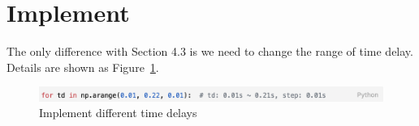 \section{Implement} %
The only difference with Section 4.3 is we need to change the range of time delay. Details are shown as Figure~\ref{5_3_code}.  

\begin{figure}[htbp]
\centering
\includegraphics[width = .999\textwidth]{figure/5_3_code.png}
\caption{Implement different time delays}
\label{5_3_code}
\end{figure}